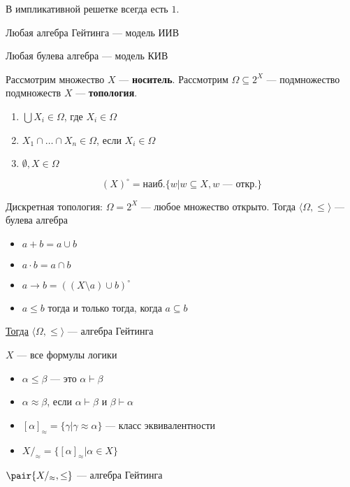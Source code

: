 \documentclass[oneside]{book}
\begin{document}
\begin{lemma}
	В импликативной решетке всегда есть \(1\).
	\label{org0609012}
\end{lemma}
\begin{theorem}
	Любая алгебра Гейтинга --- модель ИИВ
	\label{orgcca25d9}
\end{theorem}
\begin{theorem}
	Любая булева алгебра --- модель КИВ
	\label{org0e7b5f9}
\end{theorem}
\begin{definition}
	Рассмотрим множество \(X\) --- \textbf{носитель}. Рассмотрим \(\Omega \subseteq 2^X\) --- подмножество подмножеств \(X\) --- \textbf{топология}.
	\begin{enumerate}
		\item \(\bigcup X_i \in \Omega\), где \(X_i \in \Omega\)
		\item \(X_1 \cap \dots \cap X_n \in \Omega\), если \(X_i \in \Omega\)
		\item \(\emptyset, X \in \Omega\)
	\end{enumerate}
	\label{org78324b4}
\end{definition}
\begin{definition}
	\[ (X)^\circ = \text{наиб.}\{w \big| w \subseteq X, w\text{ --- откр.} \} \]
	\label{org499d5a1}
\end{definition}
\begin{examp}
	Дискретная топология: \(\Omega = 2^X\) --- любое множество открыто. Тогда \(\langle \Omega, \le \rangle\) --- булева алгебра
	\label{org9ee8813}
\end{examp}
\begin{theorem}
	\-
	\begin{itemize}
		\item \(a + b = a \cup b\)
		\item \(a \cdot b = a \cap b\)
		\item \(a \to b = \left((X \setminus a) \cup b\right)^\circ\)
		\item \(a \le b\) тогда и только тогда, когда \(a \subseteq b\)
	\end{itemize}
	\uline{Тогда} \(\langle \Omega, \le \rangle\) --- алгебра Гейтинга
	\label{org1a2deb3}
\end{theorem}
\begin{definition}
	\(X\) --- все формулы логики
	\begin{itemize}
		\item \(\alpha \le \beta\) --- это \(\alpha \vdash \beta\)
		\item \(\alpha \approx \beta\), если \(\alpha \vdash \beta\) и \(\beta \vdash \alpha\)
		\item \([\alpha]_\approx = \{\gamma \big| \gamma \approx \alpha\}\) --- класс эквивалентности
		\item \(X/_\approx = \{[\alpha]_\approx \big| \alpha \in X\}\)
	\end{itemize}
	\(\pair{X/_\approx, \le}\) --- алгебра Гейтинга
	\label{orgb341b1f}
\end{definition}
\end{document}
